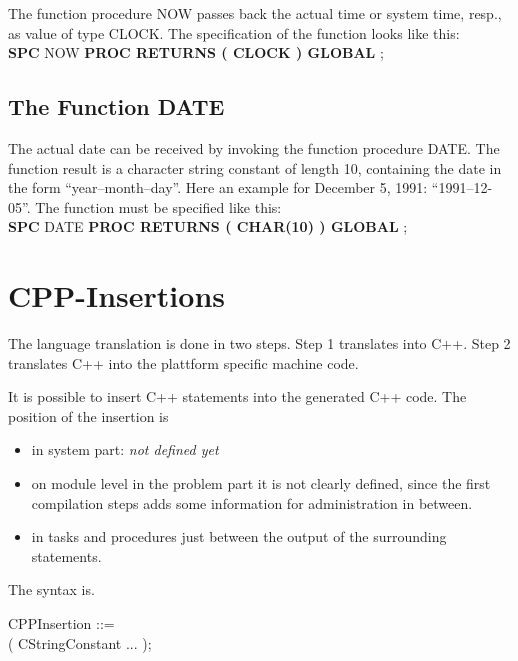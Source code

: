 The function procedure NOW passes back the actual time or system time, resp., 
as value of type CLOCK. The specification of the function looks like this:\\

{\bf SPC} NOW {\bf PROC RETURNS ( CLOCK ) GLOBAL} ; 


\subsection{The Function DATE}    %
\label{sec_function_date}

The actual date can be received by invoking the function procedure DATE.
The function result is a character string constant of length 10, containing
the date in the form ``year--month--day''. Here an example for December 5,
1991: ``1991--12-05''. The function must  be specified like this:\\

{\bf SPC} DATE {\bf PROC RETURNS ( CHAR(10) ) GLOBAL} ;

\section{CPP-Insertions}
The language translation is done in two steps.
Step 1 translates \OpenPEARL{} into C++.
Step 2 translates C++ into the plattform specific machine code.

It is possible to insert C++ statements into the generated C++ 
code. The position of the insertion is
\begin{discuss}
\begin{itemize}
\item in system part: {\em not defined yet}
\item on module level in the problem part 
   it is not clearly defined, since the first compilation
   steps adds some information for administration in between.
\item in tasks and procedures just between the output of the surrounding
statements.
\end{itemize}
\end{discuss}

The syntax is.

CPPInsertion ::=\\
 ( CStringConstant ... );

